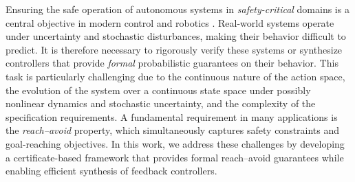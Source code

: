 \documentclass[journal,twoside,web]{ieeecolor}
\theoremstyle{definition}
\theoremstyle{plain}
\theoremstyle{plain}
\begin{document}

Ensuring the safe operation of autonomous systems in \emph{safety-critical} domains is a central objective in modern control and robotics \cite{lesser2013stochastic, li2021prediction}. Real-world systems operate under uncertainty and stochastic disturbances, making their behavior difficult to predict. It is therefore necessary to rigorously verify these systems or synthesize controllers that provide \emph{formal} probabilistic guarantees on their behavior. This task is particularly challenging due to the continuous nature of the action space, the evolution of the system over a continuous state space under possibly nonlinear dynamics and stochastic uncertainty, and the complexity of the specification requirements. A fundamental requirement in many applications is the \emph{reach–avoid} property, which simultaneously captures safety constraints and goal-reaching objectives. In this work, we address these challenges by developing a certificate-based framework that provides formal reach–avoid guarantees while enabling efficient synthesis of feedback controllers.
\end{document}
